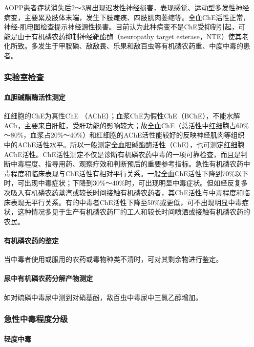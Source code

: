 AOPP患者症状消失后2～3周出现迟发性神经损害，表现感觉、运动型多发性神经病变，主要累及肢体末端，发生下肢瘫痪、四肢肌肉萎缩等。全血ChE活性正常，神经-肌电图检查提示神经源性损害。目前认为此种病变不是ChE受抑制引起，可能是由于有机磷农药抑制神经靶酯酶（neuropathy
target
esterase，NTE）使其老化所致。多发生于甲胺磷、敌敌畏、乐果和敌百虫等有机磷农药重、中度中毒的患者。

\subsubsection{实验室检查}

\paragraph{血胆碱酯酶活性测定}

红细胞的ChE为真性ChE
（AChE）；血浆ChE为假性ChE（BChE），不能水解ACh，主要来自肝脏，受肝功能的影响较大；故全血ChE（总活性中红细胞占60\%～80\%，血浆占20\%～40\%）和红细胞的AChE活性能较好的反映神经肌肉等组织中的AChE活性水平。所以一般测定全血胆碱酯酶活性（ChE），也可测定红细胞AChE活性。ChE活性测定不仅是诊断有机磷农药中毒的一项可靠检查，而且是判断中毒程度、指导用药、观察疗效和判断预后的重要参考指标。急性有机磷农药中毒程度和临床表现与ChE活性有相对平行关系。一般全血ChE活性下降到70\%以下时，可出现中毒症状；下降到30\%～40\%时，可出现明显中毒症状。但如经反复多次吸入有机磷农药蒸汽或较长时间接触有机磷农药者，其ChE活性与中毒程度和临床表现无平行关系。有的中毒者ChE活性下降至50\%或更低，可不出现明显中毒症状，这种情况多见于生产有机磷农药厂的工人和较长时间喷洒或接触有机磷农药的农民。

\paragraph{有机磷农药的鉴定}

当中毒者使用或服用的农药或毒物种类不清时，可对其剩余物进行鉴定。

\paragraph{尿中有机磷农药分解产物测定}

如对硫磷中毒尿中测到对硝基酚，敌百虫中毒尿中三氯乙醇增加。

\subsubsection{急性中毒程度分级}

\paragraph{轻度中毒}

